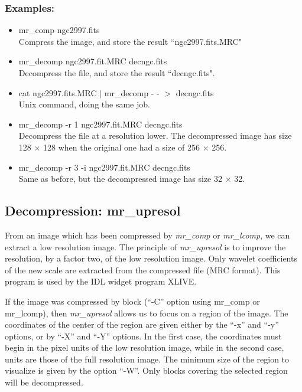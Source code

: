 \subsubsection*{Examples:}
\begin{itemize}
\baselineskip=0.4truecm
\item mr\_comp ngc2997.fits \\
Compress the image, and store the result ``ngc2997.fits.MRC"
\item mr\_decomp ngc2997.fit.MRC decngc.fits\\
Decompress the file, and store the result ``decngc.fits". 
\item cat ngc2997.fits.MRC $|$ mr\_decomp - - $>$ decngc.fits \\
Unix command, doing the same job.
\item mr\_decomp -r 1 ngc2997.fit.MRC  decngc.fits \\
Decompress the file at a resolution lower. The decompressed image
has  size 128 $\times$ 128 when the original one had a size of 256 $\times$
256.
\item mr\_decomp  -r 3 -i ngc2997.fit.MRC decngc.fits \\
Same as before, but the  decompressed image has size 32 $\times$ 32.
\end{itemize}


\newpage
\subsection{Decompression: mr\_upresol}
From an image which has been compressed by {\em mr\_comp} or {\em mr\_lcomp},
we can extract a low resolution image. The principle of {\em mr\_upresol}
is to improve the resolution, by a factor two, of the low resolution image.
Only wavelet coefficients of the
new scale are extracted from the compressed file (MRC format).   
This program is used by the IDL widget program XLIVE.

If the image was compressed by block (``-C'' option using mr\_comp or
mr\_lcomp), then {\em mr\_upresol} allows us to focus on a region of the
image. The coordinates of the center of the region are given either by the
``-x'' and ``-y'' options, or by ``-X'' and ``-Y'' options. In the first
case, the coordinates must begin in the pixel units of the low resolution image,
while in the second case, units are those of the full resolution image.
The minimum size of the region to visualize is given by the option
``-W''. Only blocks covering the selected region will be decompressed. 


